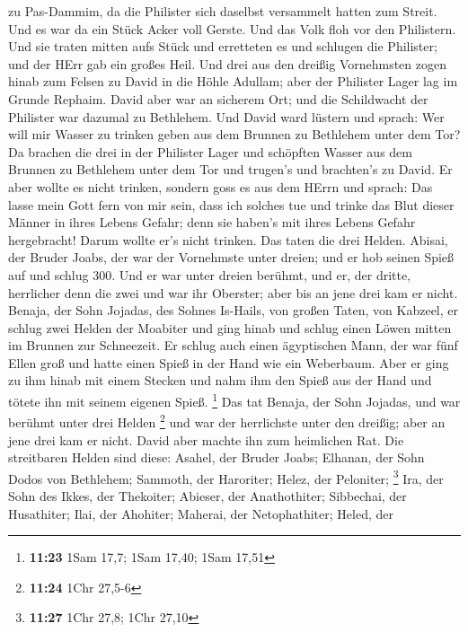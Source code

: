 zu Pas-Dammim, da die Philister sich daselbst versammelt hatten zum
Streit. Und es war da ein Stück Acker voll Gerste. Und das Volk floh vor
den Philistern.  Und sie traten mitten aufs Stück und
erretteten es und schlugen die Philister; und der HErr gab ein großes
Heil.  Und drei aus den dreißig Vornehmsten zogen hinab zum
Felsen zu David in die Höhle Adullam; aber der Philister Lager lag im
Grunde Rephaim.  David aber war an sicherem Ort; und die
Schildwacht der Philister war dazumal zu Bethlehem.  Und
David ward lüstern und sprach: Wer will mir Wasser zu trinken geben aus
dem Brunnen zu Bethlehem unter dem Tor?  Da brachen die
drei in der Philister Lager und schöpften Wasser aus dem Brunnen zu
Bethlehem unter dem Tor und trugen's und brachten's zu David. Er aber
wollte es nicht trinken, sondern goss es aus dem HErrn  und
sprach: Das lasse mein Gott fern von mir sein, dass ich solches tue und
trinke das Blut dieser Männer in ihres Lebens Gefahr; denn sie haben's
mit ihres Lebens Gefahr hergebracht! Darum wollte er's nicht trinken.
Das taten die drei Helden.  Abisai, der Bruder Joabs, der
war der Vornehmste unter dreien; und er hob seinen Spieß auf und schlug
300. Und er war unter dreien berühmt,  und er, der dritte,
herrlicher denn die zwei und war ihr Oberster; aber bis an jene drei kam
er nicht.  Benaja, der Sohn Jojadas, des Sohnes Is-Hails,
von großen Taten, von Kabzeel, er schlug zwei Helden der Moabiter und
ging hinab und schlug einen Löwen mitten im Brunnen zur Schneezeit.
 Er schlug auch einen ägyptischen Mann, der war fünf Ellen
groß und hatte einen Spieß in der Hand wie ein Weberbaum. Aber er ging
zu ihm hinab mit einem Stecken und nahm ihm den Spieß aus der Hand und
tötete ihn mit seinem eigenen Spieß. \footnote{\textbf{11:23} 1Sam 17,7;
  1Sam 17,40; 1Sam 17,51}  Das tat Benaja, der Sohn
Jojadas, und war berühmt unter drei Helden \footnote{\textbf{11:24} 1Chr
  27,5-6}  und war der herrlichste unter den dreißig; aber
an jene drei kam er nicht. David aber machte ihn zum heimlichen Rat.
 Die streitbaren Helden sind diese: Asahel, der Bruder
Joabs; Elhanan, der Sohn Dodos von Bethlehem;  Sammoth, der
Haroriter; Helez, der Peloniter; \footnote{\textbf{11:27} 1Chr 27,8;
  1Chr 27,10}  Ira, der Sohn des Ikkes, der Thekoiter;
Abieser, der Anathothiter;  Sibbechai, der Husathiter;
Ilai, der Ahohiter;  Maherai, der Netophathiter; Heled, der

